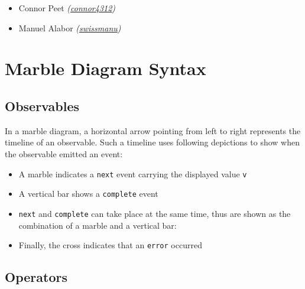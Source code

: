 \begin{itemize}
  \item Connor Peet \emph{(\href{https://github.com/connor4312}{connor4312})}
  \item Manuel Alabor \emph{(\href{https://github.com/swissmanu}{swissmanu})}
\end{itemize}









\section{Marble Diagram Syntax \label{sec:marble-diagram-syntax}}

\subsection*{Observables}

In a marble diagram, a horizontal arrow  pointing from left to right represents the timeline of an observable. Such a timeline uses following depictions to show when the observable emitted an event:

\begin{itemize}
  \item A marble  indicates a \texttt{next} event carrying the displayed value \texttt{v}
  \item A vertical bar  shows a \texttt{complete} event
  \item \texttt{next} and \texttt{complete} can take place at the same time, thus are shown as the combination of a marble and a vertical bar: 
  \item Finally, the cross  indicates that an \texttt{error} occurred
\end{itemize}

\subsection*{Operators}

